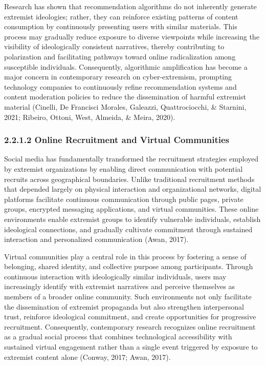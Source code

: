 \documentclass[10pt]{NSP1}
\begin{document}
	Research has shown that recommendation algorithms do not inherently generate extremist ideologies; rather, they can reinforce existing patterns of content consumption by continuously presenting users with similar materials. This process may gradually reduce exposure to diverse viewpoints while increasing the visibility of ideologically consistent narratives, thereby contributing to polarization and facilitating pathways toward online radicalization among susceptible individuals. Consequently, algorithmic amplification has become a major concern in contemporary research on cyber-extremism, prompting technology companies to continuously refine recommendation systems and content moderation policies to reduce the dissemination of harmful extremist material (Cinelli, De Francisci Morales, Galeazzi, Quattrociocchi, \& Starnini, 2021; Ribeiro, Ottoni, West, Almeida, \& Meira, 2020).
	
	\subsubsection*{2.2.1.2 Online Recruitment and Virtual Communities}
	
	Social media has fundamentally transformed the recruitment strategies employed by extremist organizations by enabling direct communication with potential recruits across geographical boundaries. Unlike traditional recruitment methods that depended largely on physical interaction and organizational networks, digital platforms facilitate continuous communication through public pages, private groups, encrypted messaging applications, and virtual communities. These online environments enable extremist groups to identify vulnerable individuals, establish ideological connections, and gradually cultivate commitment through sustained interaction and personalized communication (Awan, 2017).
	
	Virtual communities play a central role in this process by fostering a sense of belonging, shared identity, and collective purpose among participants. Through continuous interaction with ideologically similar individuals, users may increasingly identify with extremist narratives and perceive themselves as members of a broader online community. Such environments not only facilitate the dissemination of extremist propaganda but also strengthen interpersonal trust, reinforce ideological commitment, and create opportunities for progressive recruitment. Consequently, contemporary research recognizes online recruitment as a gradual social process that combines technological accessibility with sustained virtual engagement rather than a single event triggered by exposure to extremist content alone (Conway, 2017; Awan, 2017).
	
\end{document}
